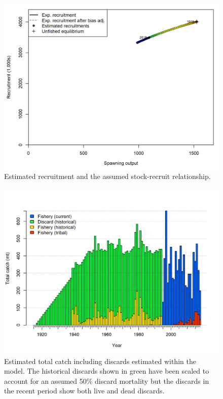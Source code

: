 \documentclass[12pt,]{article}
\begin{document}
\begin{figure}
\centering
\includegraphics{r4ss/plots_mod1/SR_curve2.png}
\caption{Estimated recruitment and the assumed stock-recruit
relationship. \label{fig:SR_curve2}}
\end{figure}

\begin{figure}
\centering
\includegraphics{r4ss/plots_mod1/catch5 total catch (including discards) stacked.png}
\caption{Estimated total catch including discards estimated within the
model. The historical discards shown in green have been scaled to
account for an assumed 50\% discard mortality but the discards in the
recent period show both live and dead discards.
\label{fig:catch_total_plot}}
\end{figure}
\end{document}
